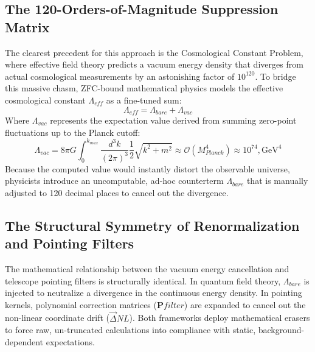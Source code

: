 \documentclass[11pt,a4paper]{article}
\theoremstyle{plain}
\theoremstyle{definition}
\begin{document}
\subsection{The 120-Orders-of-Magnitude Suppression Matrix}
The clearest precedent for this approach is the Cosmological Constant Problem, where effective field theory predicts a vacuum energy density that diverges from actual cosmological measurements by an astonishing factor of $10^{120}$. To bridge this massive chasm, ZFC-bound mathematical physics models the effective cosmological constant $\Lambda_{eff}$ as a fine-tuned sum:
\begin{equation}
\Lambda_{eff} = \Lambda_{bare} + \Lambda_{vac}
\end{equation}
Where $\Lambda_{vac}$ represents the expectation value derived from summing zero-point fluctuations up to the Planck cutoff:
\begin{equation}
\Lambda_{vac} = 8\pi G \int_{0}^{k_{max}} \frac{d^3k}{(2\pi)^3} \frac{1}{2}\sqrt{k^2 + m^2} \approx \mathcal{O}(M_{Planck}^4) \approx 10^{74} , \text{GeV}^4
\end{equation}
Because the computed value would instantly distort the observable universe, physicists introduce an uncomputable, ad-hoc counterterm $\Lambda_{bare}$ that is manually adjusted to 120 decimal places to cancel out the divergence.
\subsection{The Structural Symmetry of Renormalization and Pointing Filters}
The mathematical relationship between the vacuum energy cancellation and telescope pointing filters is structurally identical. In quantum field theory, $\Lambda_{bare}$ is injected to neutralize a divergence in the continuous energy density. In pointing kernels, polynomial correction matrices ($\mathbf{P}{filter}$) are expanded to cancel out the non-linear coordinate drift ($\vec{\Delta}{NL}$). Both frameworks deploy mathematical erasers to force raw, un-truncated calculations into compliance with static, background-dependent expectations.
\end{document}
